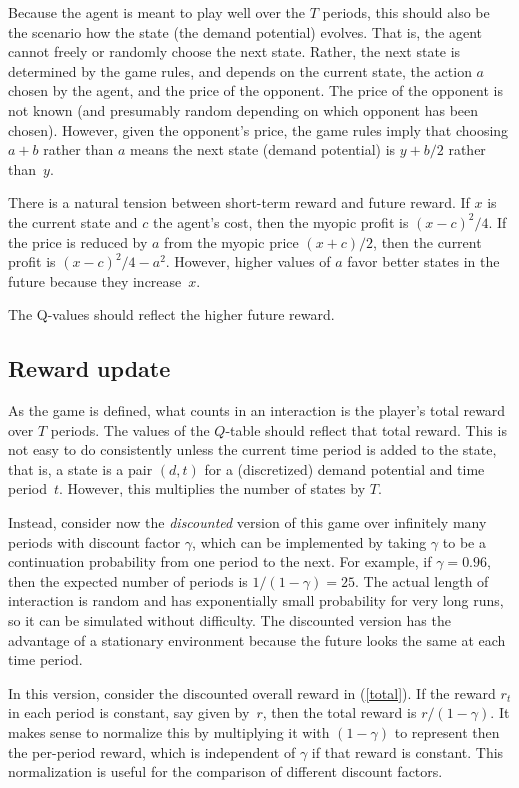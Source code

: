 \documentclass[a4paper,12pt]{article}  %
\theoremstyle{definition}
\begin{document}
Because the agent is meant to play well over the $T$
periods, this should also be the scenario how the state
(the demand potential) evolves.
That is, the agent cannot freely or randomly choose the next
state.
Rather, the next state is determined by the game rules, and
depends on the current state, the action $a$ chosen by the
agent, and the price of the opponent.
The price of the opponent is not known (and presumably
random depending on which opponent has been chosen).
However, given the opponent's price, the game rules imply
that choosing $a+b$ rather than $a$ means the next state
(demand potential) is $y+b/2$ rather than~$y$.

There is a natural tension between short-term reward and
future reward.
If $x$ is the current state and $c$ the agent's cost,
then the myopic profit is $(x-c)^2/4$.
If the price is reduced by $a$ from the myopic price
$(x+c)/2$, then the current profit is $(x-c)^2/4-a^2$.
However, higher values of $a$ favor better states in the
future because they increase~$x$. 

The Q-values should reflect the higher future reward.

\subsection{Reward update}

As the game is defined, what counts in an interaction is the
player's total reward over $T$ periods.
The values of the $Q$-table should reflect that total
reward.
This is not easy to do consistently unless the current time
period is added to the state, that is, a state is a pair
$(d,t)$ for a (discretized) demand potential and time
period~$t$.
However, this multiplies the number of states by $T$.

Instead, consider now the \textit{discounted} version of
this game over infinitely many periods with discount factor
$\gamma$, which can be implemented by taking $\gamma$ to be
a continuation probability from one period to the next.
For example, if $\gamma=0.96$, then the expected number of
periods is $1/(1-\gamma)=25$.
The actual length of interaction is random and has
exponentially small probability for very long runs, so it
can be simulated without difficulty.
The discounted version has the advantage of a stationary
environment because the future looks the same at each time
period.

In this version, consider the discounted overall reward in
(\ref{total}). 
If the reward $r_t$ in each period is constant, say given
by~$r$, then the total reward is $r/(1-\gamma)$. 
It makes sense to normalize this by multiplying it with 
$(1-\gamma)$ to represent then the per-period reward,
which is independent of $\gamma$ if that reward is constant.
This normalization is useful for the comparison of different
discount factors.
\end{document}
